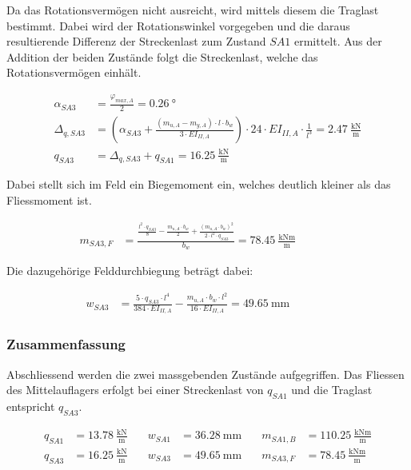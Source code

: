 \documentclass[
  11pt,
  letterpaper,
]{scrreprt}
\begin{document}
Da das Rotationsvermögen nicht ausreicht, wird mittels diesem die
Traglast bestimmt. Dabei wird der Rotationswinkel vorgegeben und die
daraus resultierende Differenz der Streckenlast zum Zustand \(SA1\)
ermittelt. Aus der Addition der beiden Zustände folgt die Streckenlast,
welche das Rotationsvermögen einhält.

\[
\begin{aligned}
\alpha_{SA3}& = \frac{\varphi_{max , A}}{2} = 0.26 \ \mathrm{°} \\ 
\Delta_{q , SA3}& = \left(\alpha_{SA3} + \frac{\left(m_{u , A} - m_{y , A}\right) \cdot l \cdot b_{w}}{3 \cdot EI_{II , A}}\right) \cdot 24 \cdot EI_{II , A} \cdot \frac{1}{l^{3}} = 2.47 \ \frac{\mathrm{kN}}{\mathrm{m}} \\ 
q_{SA3}& = \Delta_{q , SA3} + q_{SA1} = 16.25 \ \frac{\mathrm{kN}}{\mathrm{m}} \end{aligned}
\]

Dabei stellt sich im Feld ein Biegemoment ein, welches deutlich kleiner
als das Fliessmoment ist.

\[
\begin{aligned}
m_{SA3 , F}& = \frac{\frac{l^{2} \cdot q_{SA3}}{8} - \frac{m_{u , A} \cdot b_{w}}{2} + \frac{\left(m_{u , A} \cdot b_{w}\right)^{2}}{2 \cdot l^{2} \cdot q_{SA3}}}{b_{w}} = 78.45 \ \frac{\mathrm{kNm}}{\mathrm{m}} \quad &  \quad &  
 \end{aligned}
\]

Die dazugehörige Felddurchbiegung beträgt dabei:

\[
\begin{aligned}
w_{SA3}& = \frac{5 \cdot q_{SA3} \cdot l^{4}}{384 \cdot EI_{II , A}} - \frac{m_{u , A} \cdot b_{w} \cdot l^{2}}{16 \cdot EI_{II , A}} = 49.65 \ \mathrm{mm} \quad &  \quad &  
 \end{aligned}
\]

\subsubsection{Zusammenfassung}\label{zusammenfassung-2}

Abschliessend werden die zwei massgebenden Zustände aufgegriffen. Das
Fliessen des Mittelauflagers erfolgt bei einer Streckenlast von
\(q_{SA1}\) und die Traglast entspricht \(q_{SA3}\).

\[
\begin{aligned}
q_{SA1}& = 13.78 \ \frac{\mathrm{kN}}{\mathrm{m}} \quad & w_{SA1}& = 36.28 \ \mathrm{mm} \quad & m_{SA1 , B}& = 110.25 \ \frac{\mathrm{kNm}}{\mathrm{m}} \\ 
q_{SA3}& = 16.25 \ \frac{\mathrm{kN}}{\mathrm{m}} \quad & w_{SA3}& = 49.65 \ \mathrm{mm} \quad & m_{SA3 , F}& = 78.45 \ \frac{\mathrm{kNm}}{\mathrm{m}} \end{aligned}
\]
\end{document}
